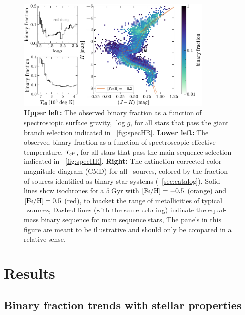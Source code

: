 \documentclass[modern]{aastex63}
\begin{document}
\begin{figure}[!t]
    \begin{center}
    \includegraphics[width=0.85\textwidth]{binary-fraction.pdf}
    \end{center}
    \caption{%
    \textbf{Upper left:} The observed binary fraction as a function of
    spectroscopic surface gravity, $\log g$, for all stars that pass the
    giant branch selection indicated in \figurename~\ref{fig:specHR}.
    \textbf{Lower left:} The observed binary fraction as a function of
    spectroscopic effective temperature, $T_{\rm eff}$, for all stars that pass
    the main sequence selection indicated in \figurename~\ref{fig:specHR}.
    \textbf{Right:} The extinction-corrected  color-magnitude
    diagram (CMD) for all \apogee\ sources, colored by the fraction of sources
    identified as binary-star systems (\sectionname~\ref{sec:catalog}).
    Solid lines show  isochrones for a $5~\mathrm{Gyr}$ with
    ${[{\rm Fe}/{\rm H}]} = -0.5$ (orange) and ${[{\rm Fe}/{\rm H}]} = 0.5$ (red), to bracket the range of
    metallicities of typical \apogee\ sources; Dashed lines (with the same
    coloring) indicate the equal-mass binary sequence for main sequence stars,
    The panels in this figure are meant to be illustrative and should only be
    compared in a relative sense.
    \label{fig:binary-CMD}
    }
\end{figure}


\section{Results} \label{sec:results}

\subsection{Binary fraction trends with stellar properties}
\label{sec:binary-fraction}
\end{document}

